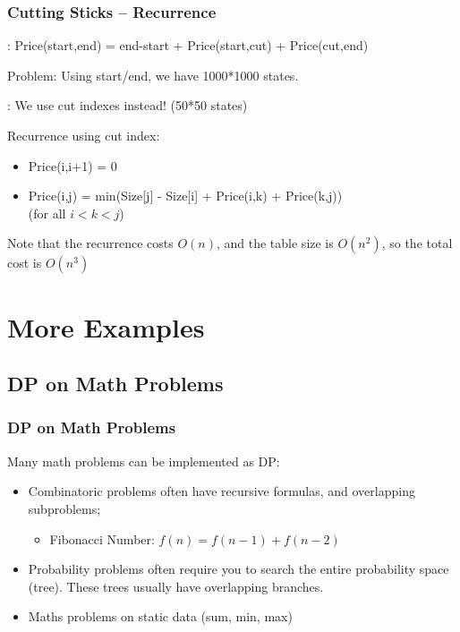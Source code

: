 \documentclass{beamer}
\begin{document}
\begin{frame}
  \frametitle{Cutting Sticks -- Recurrence}
  {\smaller
    : Price(start,end) = end-start + Price(start,cut) + Price(cut,end)

    \medskip

    \alert{Problem}: Using start/end, we have 1000*1000 states.

    \medskip
    
    : We use cut indexes instead! (50*50 states)

    \vfill

    \begin{block}{Recurrence using cut index:}
    \begin{itemize}
    \item Price(i,i+1) = 0 
    \item Price(i,j) = min(Size[j] - Size[i] + Price(i,k) + Price(k,j))\\
      (for all $i < k < j$)        
    \end{itemize}
    \end{block}


    \medskip
    
    Note that the recurrence costs $O(n)$, and the table size is $O(n^2)$, 
    so the total cost is $O(n^3)$ }
\end{frame}


\section{More Examples}
\subsection{DP on Math Problems}

\begin{frame}
  \frametitle{DP on Math Problems}
  Many math problems can be implemented as DP:
  \begin{itemize}
  \item Combinatoric problems often have recursive formulas, and
    overlapping subproblems;
    \begin{itemize}
    \item Fibonacci Number: $f(n) = f(n-1)+f(n-2)$
    \end{itemize}
  \item Probability problems often require you to search the entire
    probability space (tree). These trees usually have overlapping branches.
  \item Maths problems on static data (sum, min, max)
  \end{itemize}
\end{frame}
\end{document}
